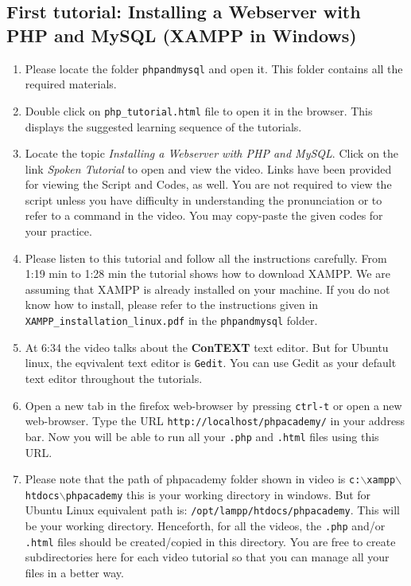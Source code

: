 \documentclass[11pt]{article}
\newenvironment{enumcpt}{\begin{enumerate} \topsep 0pt \partopsep 0pt 
    \parsep 0pt
    \itemsep 0pt \leftmargin -1in \rightmargin 0pt
}{\end{enumerate}}
\begin{document}
\begin{multicols}{2}
  \section{First tutorial: Installing a Webserver with PHP and MySQL (XAMPP in Windows)}
  \begin{enumcpt}
  \item Please locate the folder {\tt phpandmysql} and open it. This folder
    contains all the required materials.
  \item Double click on {\tt php\_tutorial.html} file to open it in the
    browser.  This displays the suggested learning sequence of the
    tutorials.
  \item Locate the topic \emph{Installing a Webserver with PHP and
    MySQL}. Click on the link \emph{Spoken Tutorial} to open and view the
    video.  Links have been provided for viewing the Script and Codes,
    as well.  You are not required to view the script unless you have
    difficulty in understanding the pronunciation or to refer to a
    command in the video.  You may copy-paste the given codes for your
    practice.
  \item Please listen to this tutorial and follow all the instructions
    carefully. From 1:19 min to 1:28 min the tutorial shows how to
    download XAMPP. We are assuming that XAMPP is already installed on
    your machine.  If you do not know how to install, please refer to
    the instructions given in {\tt XAMPP\_installation\_linux.pdf} in the
    {\tt phpandmysql} folder.
  \item At 6:34 the video talks about the \textbf{ConTEXT} text editor. But for
    Ubuntu linux, the eqvivalent text editor is {\tt Gedit}. You can use Gedit
    as your default text editor throughout the tutorials.
  \item Open a new tab in the firefox web-browser by pressing {\tt ctrl-t} or
    open a new web-browser. Type the URL {\tt http://localhost/phpacademy/} in
    your address bar. Now you will be able to run all your {\tt .php} and
    {\tt .html} files using this URL.
  \item Please note that the path of phpacademy folder shown in video is
    {\tt c:$\backslash$xampp$\backslash$htdocs$\backslash$phpacademy}
    this is your working directory in windows. But for Ubuntu Linux
    equivalent path is: {\tt /opt/lampp/htdocs/phpacademy}. This will be your
    working directory.  Henceforth, for all the videos, the {\tt .php} and/or
    {\tt .html} files should be created/copied in this directory. You are free
    to create subdirectories here for each video tutorial so that you
    can manage all your files in a better way.


\end{enumcpt}
\end{multicols}
\end{document}
